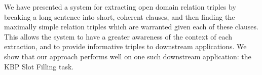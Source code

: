 We have presented a system for extracting open domain relation triples
  by breaking a long sentence into short, coherent clauses, and then
  finding the maximally simple relation triples which are warranted given
  each of these clauses.
This allows the system to have a greater awareness of the context of each
  extraction, and to provide informative triples to downstream applications.
We show that our approach performs well on one such downstream application:
  the KBP Slot Filling task.
